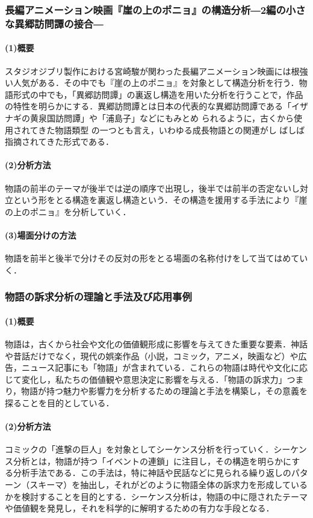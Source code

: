\subsubsection{長編アニメーション映画『崖の上のポニョ』の構造分析―2編の小さな異郷訪問譚の接合―}
\paragraph*{(1)概要}
スタジオジブリ製作における宮崎駿が関わった長編アニメーション映画には根強い人気がある．その中でも『崖の上のポニョ』を対象として構造分析を行う\cite{ponyo}．物語形式の中でも，「異郷訪問譚」の裏返し構造を用いた分析を行うことで，作品の特性を明らかにする．異郷訪問譚とは日本の代表的な異郷訪問譚である「イザナギの黄泉国訪問譚」や「浦島子」などにもみとめ られるように，古くから使用されてきた物語類型 の一つとも言え，いわゆる成長物語との関連がし ばしば指摘されてきた形式である．
\paragraph*{(2)分析方法}
物語の前半のテーマが後半では逆の順序で出現し，後半では前半の否定ないし対立という形をとる構造を裏返し構造という．その構造を援用する手法により『崖の上のポニョ』を分析していく．
\paragraph*{(3)場面分けの方法}
物語を前半と後半で分けその反対の形をとる場面の名称付けをして当てはめていく．

\subsubsection{物語の訴求分析の理論と手法及び応用事例}
\paragraph*{(1)概要}
物語は，古くから社会や文化の価値観形成に影響を与えてきた重要な要素．神話や昔話だけでなく，現代の娯楽作品（小説，コミック，アニメ，映画など）や広告，ニュース記事にも「物語」が含まれている．これらの物語は時代や文化に応じて変化し，私たちの価値観や意思決定に影響を与える\cite{sokyu}．「物語の訴求力」つまり，物語が持つ魅力や影響力を分析するための理論と手法を構築し，その意義を探ることを目的としている．
\paragraph*{(2)分析方法}
コミックの「進撃の巨人」を対象としてシーケンス分析を行っていく．シーケンス分析とは，物語が持つ「イベントの連鎖」に注目し，その構造を明らかにする分析手法である．この手法は，特に神話や民話などに見られる繰り返しのパターン（スキーマ）を抽出し，それがどのように物語全体の訴求力を形成しているかを検討することを目的とする．シーケンス分析は，物語の中に隠されたテーマや価値観を発見し，それを科学的に解明するための有力な手段となる．
